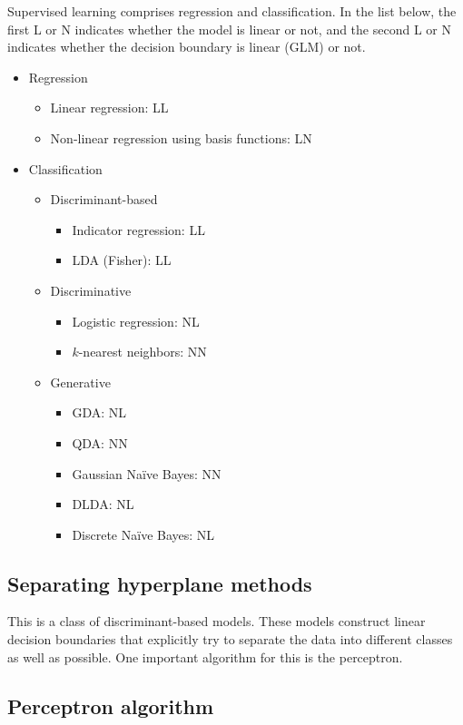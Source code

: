 \documentclass[a4paper,12pt]{article}
\begin{document}
Supervised learning comprises regression and classification. In the list below, the first L or N indicates whether the model is linear or not, and the second L or N indicates whether the decision boundary is linear (GLM) or not. 
\begin{itemize}
\item
Regression
	\begin{itemize}
	\item Linear regression: LL
	\item Non-linear regression using basis functions: LN
	\end{itemize}
\item
Classification
	\begin{itemize}
	\item Discriminant-based
		\begin{itemize}
		\item Indicator regression: LL
		\item LDA (Fisher): LL
		\end{itemize}
	\item Discriminative
		\begin{itemize}
		\item Logistic regression: NL
		\item $k$-nearest neighbors: NN
		\end{itemize}
	\item Generative
		\begin{itemize}
		\item GDA: NL
		\item QDA: NN
		\item Gaussian Naïve Bayes: NN
		\item DLDA: NL
		\item Discrete Naïve Bayes: NL
		\end{itemize}
	\end{itemize}
\end{itemize}

\subsection{Separating hyperplane methods}

This is a class of discriminant-based models. These models construct linear decision boundaries that explicitly try to separate the data into different classes as well as possible. One important algorithm for this is the perceptron. 

\subsection{Perceptron algorithm}
\end{document}

